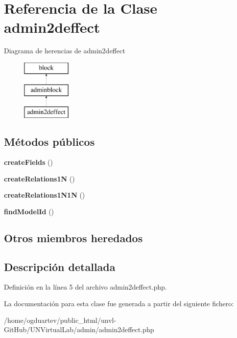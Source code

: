 \hypertarget{classadmin2deffect}{}\section{Referencia de la Clase admin2deffect}
\label{classadmin2deffect}
Diagrama de herencias de admin2deffect\begin{figure}[H]
\begin{center}
\leavevmode
\includegraphics[height=3.000000cm]{classadmin2deffect}
\end{center}
\end{figure}
\subsection*{Métodos públicos}
\begin{DoxyCompactItemize}
\item 
\mbox{\label{classadmin2deffect_a53778a0feb5e76953729f6d462a60a6d}} 
{\bfseries create\+Fields} ()
\item 
\mbox{\label{classadmin2deffect_ad419ce3181b153ff1ca5a3e9489d0d0c}} 
{\bfseries create\+Relations1N} ()
\item 
\mbox{\label{classadmin2deffect_a248fde2f295d2f474d17cdb8687db3e9}} 
{\bfseries create\+Relations1\+N1N} ()
\item 
\mbox{\label{classadmin2deffect_aa7719143b1c8117347888897aa8e91de}} 
{\bfseries find\+Model\+Id} ()
\end{DoxyCompactItemize}
\subsection*{Otros miembros heredados}


\subsection{Descripción detallada}


Definición en la línea 5 del archivo admin2deffect.\+php.



La documentación para esta clase fue generada a partir del siguiente fichero\+:\begin{DoxyCompactItemize}
\item 
/home/ogduartev/public\+\_\+html/unvl-\/\+Git\+Hub/\+U\+N\+Virtual\+Lab/admin/admin2deffect.\+php\end{DoxyCompactItemize}
